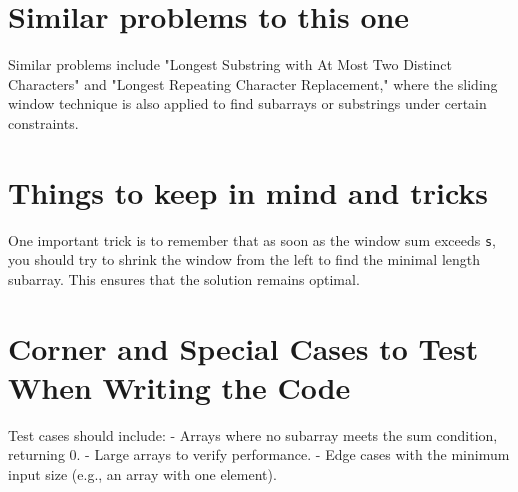 \section*{Similar problems to this one}

Similar problems include "Longest Substring with At Most Two Distinct Characters" and "Longest Repeating Character Replacement," where the sliding window technique is also applied to find subarrays or substrings under certain constraints.

\section*{Things to keep in mind and tricks}

One important trick is to remember that as soon as the window sum exceeds \texttt{s}, you should try to shrink the window from the left to find the minimal length subarray. This ensures that the solution remains optimal.

\section*{Corner and Special Cases to Test When Writing the Code}

Test cases should include:
- Arrays where no subarray meets the sum condition, returning 0.
- Large arrays to verify performance.
- Edge cases with the minimum input size (e.g., an array with one element).




